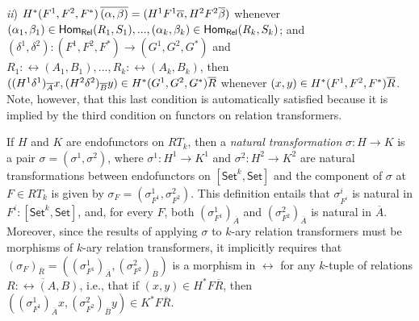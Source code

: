 \documentclass[runningheads]{llncs}
\newcommand{\set}{\mathsf{Set}}
\begin{document}
{\em ii})
  $H^*(F^1,F^2,F^*)\, \overline{(\alpha, \beta)} = (H^1F^1\overline{\alpha}, H^2F^2
  \overline{\beta})$ whenever $(\alpha_1, \beta_1) \in \mathsf{Hom_{Rel}}(R_1,S_1),..., (\alpha_k,
  \beta_k) \in \mathsf{Hom_{Rel}}(R_k,S_k)$; and
  $(\delta^1,\delta^2) : (F^1,F^2,F^*)\to (G^1,G^2,G^*)$ and
  $R_1:\rel(A_1,B_1),...,R_k:\rel(A_k,B_k)$, then
  $((H^1\delta^1)_{\overline{A}}x, (H^2\delta^2)_{\overline{B}}y) \in
  H^*(G^1,G^2,G^*)\overline{R}$ whenever $(x, y) \in
  H^*(F^1,F^2,F^*)\overline{R}$. Note, however, that this last condition is
  automatically satisfied because it is implied by the third condition
  on functors on relation transformers.

If $H$ and $K$ are endofunctors on $RT_k$, then a {\em natural
  transformation} $\sigma : H \to K$ is a pair $\sigma = (\sigma^1,
\sigma^2)$, where $\sigma^1 : H^1 \to K^1$ and $\sigma^2 : H^2 \to
K^2$ are natural transformations between endofunctors on
$[\set^k,\set]$ and the component of $\sigma$ at $F
\in RT_k$ is given by $\sigma_F = (\sigma^1_{F^1}, \sigma^2_{F^2})$.
This definition
entails that $\sigma^i_{F^i}$ is natural in $F^i : [\set^k,\set]$,
and, for every $F$, both $(\sigma^1_{F^1})_{\overline{A}}$ and
$(\sigma^2_{F^2})_{\overline{A}}$ is natural in $\overline{A}$.
Moreover, since the results of applying $\sigma$ to $k$-ary relation
transformers must be morphisms of $k$-ary relation transformers,
it implicitly requires that $(\sigma_F)_{\overline{R}} = (
(\sigma^1_{F^1})_{\overline{A}}, (\sigma^2_{F^2})_{\overline{B}})$ is
a morphism in $\rel$ for any $k$-tuple of relations $\overline{R :
  \rel(A, B)}$, i.e., that if $(x, y) \in H^*F\overline{R}$, then
$((\sigma^1_{F^1})_{\overline{A}} x, (\sigma^2_{F^2})_{\overline{B}}
y) \in K^*F\overline{R}$.

\vspace*{0.1in}
\end{document}
